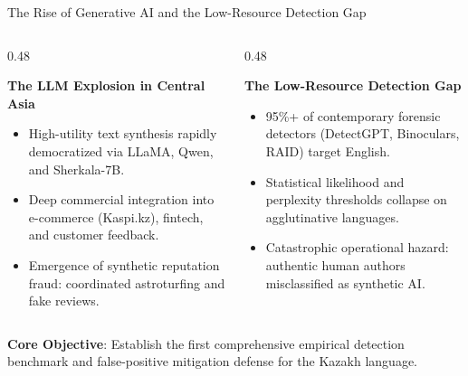 \documentclass[aspectratio=169, 10pt]{beamer}
\newcommand{\subhead}[1]{{\normalsize\textbf{\color{DarkNavy}#1}\par\vspace{3pt}}}
\begin{document}
\begin{frame}{The Rise of Generative AI and the Low-Resource Detection Gap}
    \begin{columns}[T]
        \begin{column}{0.48\textwidth}
            \subhead{The LLM Explosion in Central Asia}
            \begin{itemize}\setlength{\itemsep}{5pt}
                \item High-utility text synthesis rapidly democratized via LLaMA, Qwen, and Sherkala-7B.
                \item Deep commercial integration into e-commerce (Kaspi.kz), fintech, and customer feedback.
                \item Emergence of synthetic reputation fraud: coordinated astroturfing and fake reviews.
            \end{itemize}
        \end{column}
        \begin{column}{0.48\textwidth}
            \subhead{The Low-Resource Detection Gap}
            \begin{itemize}\setlength{\itemsep}{5pt}
                \item 95\%+ of contemporary forensic detectors (DetectGPT, Binoculars, RAID) target English.
                \item Statistical likelihood and perplexity thresholds collapse on agglutinative languages.
                \item Catastrophic operational hazard: authentic human authors misclassified as synthetic AI.
            \end{itemize}
        \end{column}
    \end{columns}
    
    \vspace{0.35cm}
    \noindent\textbf{\color{DarkNavy}Core Objective}: Establish the first comprehensive empirical detection benchmark and false-positive mitigation defense for the Kazakh language.
\end{frame}
\end{document}
